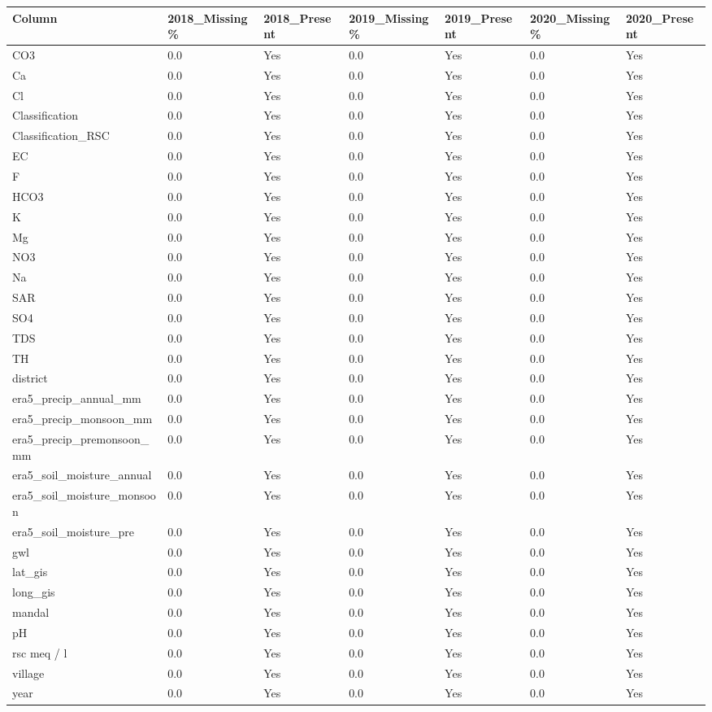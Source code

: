 \begin{tabular}{lllllll}
\toprule
Column & 2018\_Missing\% & 2018\_Present & 2019\_Missing\% & 2019\_Present & 2020\_Missing\% & 2020\_Present \\
\midrule
CO3 & 0.0 & Yes & 0.0 & Yes & 0.0 & Yes \\
Ca & 0.0 & Yes & 0.0 & Yes & 0.0 & Yes \\
Cl & 0.0 & Yes & 0.0 & Yes & 0.0 & Yes \\
Classification & 0.0 & Yes & 0.0 & Yes & 0.0 & Yes \\
Classification\_RSC & 0.0 & Yes & 0.0 & Yes & 0.0 & Yes \\
EC & 0.0 & Yes & 0.0 & Yes & 0.0 & Yes \\
F & 0.0 & Yes & 0.0 & Yes & 0.0 & Yes \\
HCO3 & 0.0 & Yes & 0.0 & Yes & 0.0 & Yes \\
K & 0.0 & Yes & 0.0 & Yes & 0.0 & Yes \\
Mg & 0.0 & Yes & 0.0 & Yes & 0.0 & Yes \\
NO3 & 0.0 & Yes & 0.0 & Yes & 0.0 & Yes \\
Na & 0.0 & Yes & 0.0 & Yes & 0.0 & Yes \\
SAR & 0.0 & Yes & 0.0 & Yes & 0.0 & Yes \\
SO4 & 0.0 & Yes & 0.0 & Yes & 0.0 & Yes \\
TDS & 0.0 & Yes & 0.0 & Yes & 0.0 & Yes \\
TH & 0.0 & Yes & 0.0 & Yes & 0.0 & Yes \\
district & 0.0 & Yes & 0.0 & Yes & 0.0 & Yes \\
era5\_precip\_annual\_mm & 0.0 & Yes & 0.0 & Yes & 0.0 & Yes \\
era5\_precip\_monsoon\_mm & 0.0 & Yes & 0.0 & Yes & 0.0 & Yes \\
era5\_precip\_premonsoon\_mm & 0.0 & Yes & 0.0 & Yes & 0.0 & Yes \\
era5\_soil\_moisture\_annual & 0.0 & Yes & 0.0 & Yes & 0.0 & Yes \\
era5\_soil\_moisture\_monsoon & 0.0 & Yes & 0.0 & Yes & 0.0 & Yes \\
era5\_soil\_moisture\_pre & 0.0 & Yes & 0.0 & Yes & 0.0 & Yes \\
gwl & 0.0 & Yes & 0.0 & Yes & 0.0 & Yes \\
lat\_gis & 0.0 & Yes & 0.0 & Yes & 0.0 & Yes \\
long\_gis & 0.0 & Yes & 0.0 & Yes & 0.0 & Yes \\
mandal & 0.0 & Yes & 0.0 & Yes & 0.0 & Yes \\
pH & 0.0 & Yes & 0.0 & Yes & 0.0 & Yes \\
rsc meq / l & 0.0 & Yes & 0.0 & Yes & 0.0 & Yes \\
village & 0.0 & Yes & 0.0 & Yes & 0.0 & Yes \\
year & 0.0 & Yes & 0.0 & Yes & 0.0 & Yes \\
\bottomrule
\end{tabular}
